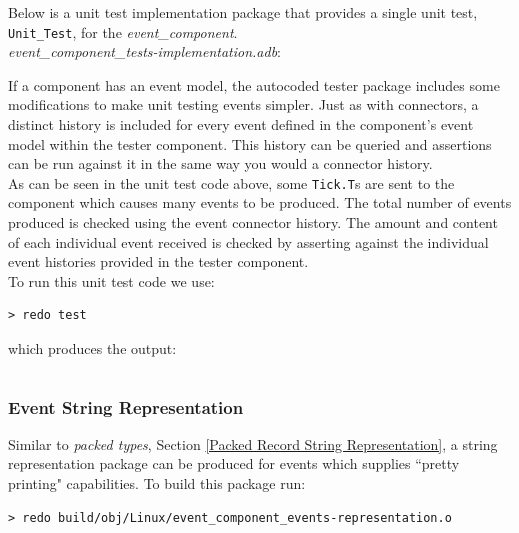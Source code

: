 Below is a unit test implementation package that provides a single unit test, \texttt{Unit\_Test}, for the \textit{event\_component}. \\

\textit{event\_component\_tests-implementation.adb}:

If a component has an event model, the autocoded tester package includes some modifications to make unit testing events simpler. Just as with connectors, a distinct history is included for every event defined in the component's event model within the tester component. This history can be queried and assertions can be run against it in the same way you would a connector history. \\

As can be seen in the unit test code above, some \texttt{Tick.T}s are sent to the component which causes many events to be produced. The total number of events produced is checked using the event connector history. The amount and content of each individual event received is checked by asserting against the individual event histories provided in the tester component. \\

To run this unit test code we use:

\vspace{5mm} %
\begin{verbatim}
> redo test
\end{verbatim}
\vspace{5mm} %

which produces the output:

\vspace{5mm} %
\inputminted{text}{../example_architecture/event_component/test/output.txt}
\vspace{5mm} %

\subsubsection{Event String Representation} \label{Event String Representation}

Similar to \textit{packed types}, Section \ref{Packed Record String Representation}, a string representation package can be produced for events which supplies ``pretty printing" capabilities. To build this package run:

\vspace{5mm} %
\begin{verbatim}
> redo build/obj/Linux/event_component_events-representation.o
\end{verbatim}
\vspace{5mm} %

